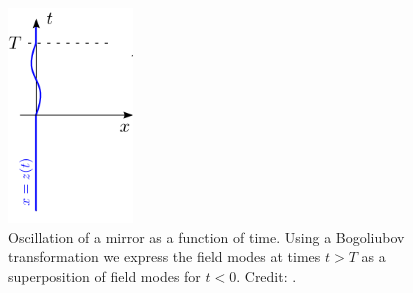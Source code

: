 \begin{figure}
    \centering
    \includegraphics[width=1.3in, keepaspectratio]{figures/intro/Nation2011_transformation.png}
    \caption{Oscillation of a mirror as a function of time. Using a Bogoliubov transformation we express the field modes 
    at times $t>T$ as a superposition of field modes for $t<0$. Credit: \protect\cite{Nation2011}.}
    \label{fig:Nation_transformation}
\end{figure}

\newpage

